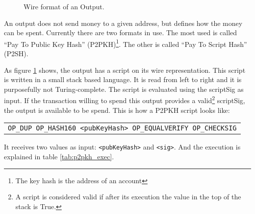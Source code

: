\begin{figure}[ht]
  \centering
  
  \caption{Wire format of an Output.}
  \label{fig:output}
\end{figure}

An output does not send money to a given address, but defines how the money can
  be spent. Currently there are two formats in use. The most used is called
  ``Pay To Public Key Hash'' (P2PKH)\footnote{The key hash is the address of an
  account}. The other is called ``Pay To Script Hash'' (P2SH).

As figure \ref{fig:output} shows, the output has a script on its wire
  representation.
This script is written in a small stack based language.
It is read from left to right and it is purposefully not Turing-complete.
The script is evaluated using the scriptSig as input. If the transaction willing
  to spend this output provides a valid\footnote{A script is considered valid
  if after its execution the value in the top of the stack is True.} scriptSig,
  the output is available to be spend. This is how a P2PKH script looks like:

\begin{center}
  \begin{tabular}{|c|}
    \texttt{OP\_DUP OP\_HASH160 <pubKeyHash> OP\_EQUALVERIFY OP\_CHECKSIG}
  \end{tabular}
\end{center}

  It receives two values as input:  \lstinline{<pubKeyHash>} and
  \lstinline{<sig>}. And the execution is explained in table%
    \ref{tab:p2pkh_exec}.

